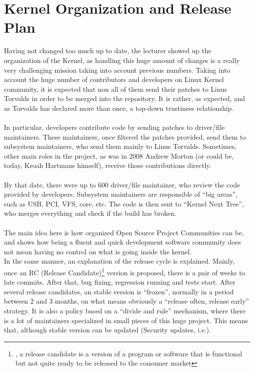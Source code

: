 \documentclass[11pt]{article}
\begin{document}
\section{Kernel Organization and Release Plan}
Having not changed too much up to date, the lecturer showed up the organization of the Kernel, as handling this huge amount of changes is a really very challenging mission taking into account previous numbers. Taking into account the huge number of contributors and developers on Linux Kernel community, it is expected that non all of them send their patches to Linus Torvalds in order to be merged into the repository. It is rather, as expected, and as Torvalds has declared more than once, a top-down trustiness relationship.\\
\\
In particular, developers contribute code by sending patches to driver/file maintainers. These maintainers, once filtered the patches provided, send them to subsystem maintainers, who send them mainly to Linus Torvalds. Sometimes, other main roles in the project, as was in 2008 Andrew Morton (or could be, today, Kroah Hartmans himself), receive those contributions directly.\\
\\
By that date, there were up to 600 driver/file maintainer, who review the code provided by developers. Subsystem maintainers are responsible of ``big areas'', such as USB, PCI, VFS, core, etc. The code is then sent to ``Kernel Next Tree'', who merges everything and check if the build has broken.\\
\\
The main idea here is how organized Open Source Project Communities can be, and shows how being a fluent and quick development software community does not mean having no control on what is going inside the kernel.\\
In the same manner, an explanation of the release cycle is explained. Mainly, once an RC (Release Candidate)\footnote {, a release candidate is a version of a program or software that is functional but not quite ready to be released to the consumer market} version is proposed, there is a pair of weeks to late commits. After that, bug fixing, regression running and tests start. After several release candidates, an stable version is ``frozen'', normally in a period between 2 and 3 months, on what means obviously a ``release often, release early'' strategy. It is also a policy based on a ``divide and rule'' mechanism, where there is a lot of maintainers specialized in small pieces of this huge project. This means that, although stable version can be updated (Security updates, i.e.).\\
\end{document}
